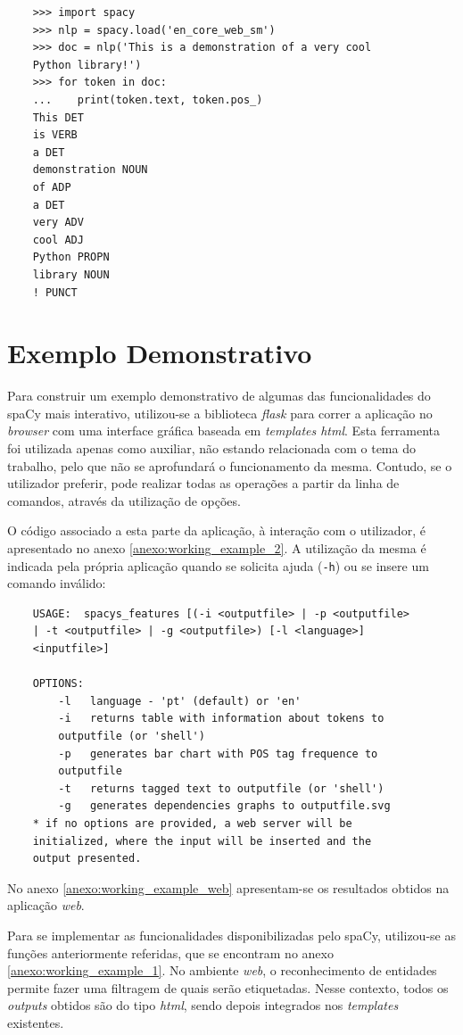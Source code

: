 \documentclass[12pt]{article}
\begin{document}
\begin{verbatim}
	>>> import spacy
	>>> nlp = spacy.load('en_core_web_sm')
	>>> doc = nlp('This is a demonstration of a very cool
	Python library!')
	>>> for token in doc:
	...    print(token.text, token.pos_)
	This DET
	is VERB
	a DET
	demonstration NOUN
	of ADP
	a DET
	very ADV
	cool ADJ
	Python PROPN
	library NOUN
	! PUNCT	
\end{verbatim}


\section{Exemplo Demonstrativo} %

Para construir um exemplo demonstrativo de algumas das funcionalidades do spaCy mais interativo, utilizou-se a biblioteca \textit{flask} para correr a aplicação no \textit{browser} com uma interface gráfica baseada em \textit{templates html}. Esta ferramenta foi utilizada apenas como auxiliar, não estando relacionada com o tema do trabalho, pelo que não se aprofundará o funcionamento da mesma. Contudo, se o utilizador preferir, pode realizar todas as operações a partir da linha de comandos, através da utilização de opções.

O código associado a esta parte da aplicação, à interação com o utilizador, é apresentado no anexo \ref{anexo:working_example_2}. A utilização da mesma é indicada pela própria aplicação quando se solicita ajuda (\texttt{-h}) ou se insere um comando inválido:

\newpage

\begin{verbatim}
    USAGE:  spacys_features [(-i <outputfile> | -p <outputfile>
    | -t <outputfile> | -g <outputfile>) [-l <language>] 
    <inputfile>]

    OPTIONS:
        -l   language - 'pt' (default) or 'en'
		-i   returns table with information about tokens to
		outputfile (or 'shell')
		-p   generates bar chart with POS tag frequence to
		outputfile
        -t   returns tagged text to outputfile (or 'shell')
        -g   generates dependencies graphs to outputfile.svg
	* if no options are provided, a web server will be 
	initialized, where the input will be inserted and the
	output presented.
\end{verbatim}

No anexo \ref{anexo:working_example_web} apresentam-se os resultados obtidos na aplicação \textit{web}.

Para se implementar as funcionalidades disponibilizadas pelo spaCy, utilizou-se as funções anteriormente referidas, que se encontram no anexo \ref{anexo:working_example_1}. No ambiente \textit{web}, o reconhecimento de entidades permite fazer uma filtragem de quais serão etiquetadas. Nesse contexto, todos os \textit{outputs} obtidos são do tipo \textit{html}, sendo depois integrados nos \textit{templates} existentes.
\end{document}
